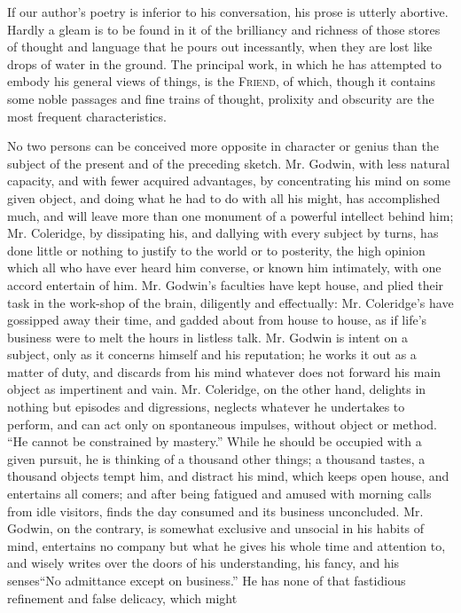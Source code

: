If our author's poetry is inferior to his conversation, his prose
is utterly abortive. Hardly a gleam is to be found in it of the
brilliancy and richness of those stores of thought and language
that he pours out incessantly, when they are lost like drops of
water in the ground. The principal work, in which he has attempted
to embody his general views of things, is the \textsc{Friend}, of which,
though it contains some noble passages and fine trains of thought,
prolixity and obscurity are the most frequent characteristics.

No two persons can be conceived more opposite in character or
genius than the subject of the present and of the preceding
sketch. Mr. Godwin, with less natural capacity, and with fewer
acquired advantages, by concentrating his mind on some given
object, and doing what he had to do with all his might, has
accomplished much, and will leave more than one monument of a
powerful intellect behind him; Mr. Coleridge, by dissipating his,
and dallying with every subject by turns, has done little or
nothing to justify to the world or to posterity, the high opinion
which all who have ever heard him converse, or known him
intimately, with one accord entertain of him. Mr. Godwin's
faculties have kept house, and plied their task in the work-shop
of the brain, diligently and effectually: Mr. Coleridge's have
gossipped away their time, and gadded about from house to house,
as if life's business were to melt the hours in listless
talk. Mr. Godwin is intent on a subject, only as it concerns
himself and his reputation; he works it out as a matter of duty,
and discards from his mind whatever does not forward his main
object as impertinent and vain. Mr. Coleridge, on the other hand,
delights in nothing but episodes and digressions, neglects
whatever he undertakes to perform, and can act only on spontaneous
impulses, without object or method. ``He cannot be constrained by
mastery.'' While he should be occupied with a given pursuit, he is
thinking of a thousand other things; a thousand tastes, a thousand
objects tempt him, and distract his mind, which keeps open house,
and entertains all comers; and after being fatigued and amused
with morning calls from idle visitors, finds the day consumed and
its business unconcluded. Mr. Godwin, on the contrary, is somewhat
exclusive and unsocial in his habits of mind, entertains no
company but what he gives his whole time and attention to, and
wisely writes over the doors of his understanding, his fancy, and
his senses\textemdash ``No admittance except on business.'' He has
none of that fastidious refinement and false delicacy, which might

